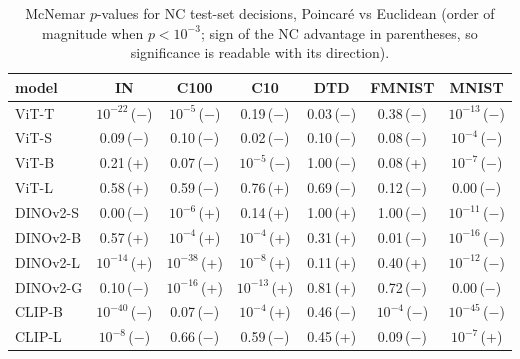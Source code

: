 \begin{table}[H]
\centering
\small
\begin{tabular}{lcccccc}
\toprule
model & IN & C100 & C10 & DTD & FMNIST & MNIST \\
\midrule
ViT-T & $10^{-22}$\,($-$) & $10^{-5}$\,($-$) & 0.19\,($-$) & 0.03\,($-$) & 0.38\,($-$) & $10^{-13}$\,($-$) \\
ViT-S & 0.09\,($-$) & 0.10\,($-$) & 0.02\,($-$) & 0.10\,($-$) & 0.08\,($-$) & $10^{-4}$\,($-$) \\
ViT-B & 0.21\,(+) & 0.07\,($-$) & $10^{-5}$\,($-$) & 1.00\,($-$) & 0.08\,(+) & $10^{-7}$\,($-$) \\
ViT-L & 0.58\,(+) & 0.59\,($-$) & 0.76\,(+) & 0.69\,($-$) & 0.12\,($-$) & 0.00\,($-$) \\
DINOv2-S & 0.00\,($-$) & $10^{-6}$\,(+) & 0.14\,(+) & 1.00\,(+) & 1.00\,($-$) & $10^{-11}$\,($-$) \\
DINOv2-B & 0.57\,(+) & $10^{-4}$\,(+) & $10^{-4}$\,(+) & 0.31\,(+) & 0.01\,($-$) & $10^{-16}$\,($-$) \\
DINOv2-L & $10^{-14}$\,(+) & $10^{-38}$\,(+) & $10^{-8}$\,(+) & 0.11\,(+) & 0.40\,(+) & $10^{-12}$\,($-$) \\
DINOv2-G & 0.10\,($-$) & $10^{-16}$\,(+) & $10^{-13}$\,(+) & 0.81\,(+) & 0.72\,($-$) & 0.00\,($-$) \\
CLIP-B & $10^{-40}$\,($-$) & 0.07\,($-$) & $10^{-4}$\,(+) & 0.46\,($-$) & $10^{-4}$\,($-$) & $10^{-45}$\,($-$) \\
CLIP-L & $10^{-8}$\,($-$) & 0.66\,($-$) & 0.59\,($-$) & 0.45\,(+) & 0.09\,($-$) & $10^{-7}$\,(+) \\
\bottomrule
\end{tabular}
\caption{McNemar $p$-values for NC test-set decisions, Poincar\'e vs Euclidean (order of magnitude when $p<10^{-3}$; sign of the NC advantage in parentheses, so significance is readable with its direction).}
\label{tab:a6}
\end{table}
